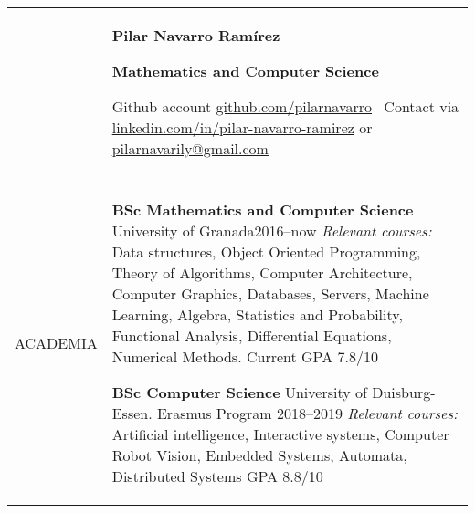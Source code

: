 \documentclass[letterpaper,10pt,oneside]{article}
\newcommand{\DatestampY}[1]{#1}
\newenvironment{body}
{\par\par
\begin{longtable}{p{0.125\textwidth}p{0.84\textwidth}}}
{\par\end{longtable}\par}
\renewcommand{\section}[3]{\\[-0.7cm]\pdfbookmark[2]{#2}{#3}\\%
\raggedleft  %
{\fontsize{9.5pt}{9.5pt}\selectfont\bfseries\raggedright%
\MakeUppercase{#1}}&}
\newcommand{\SmallEntryGap}{\par\vspace{0.38em}\par}
\newcommand{\roundpic}[4][]{
\tikz\node [circle, minimum width = #2,
path picture = {
\node [#1] at (path picture bounding box.center) {
\texttt{[image: \#4]}};
}] {};}
\begin{document}

\begin{body}

&
\vspace{-2.45cm} \par
\huge{\textbf{Pilar Navarro Ramírez}} \par
\large{\textbf{Mathematics and Computer Science}} \par
\normalsize{Github account \href{https://github.com/pilarnavarro}{github.com/pilarnavarro} \textemdash\ Contact via  \href{https://www.linkedin.com/in/pilar-navarro-ramirez/} {linkedin.com/in/pilar-navarro-ramirez} or \href{pilarnavarily@gmail.com} {pilarnavarily@gmail.com}}
\vspace{0.1cm}




\section{Academia}{Academia}{PDF:Academia}

\textbf{BSc Mathematics and Computer Science} University of Granada\hfill \DatestampY{2016}--\DatestampY{now} \newline
\textit{Relevant courses:} Data structures, Object Oriented Programming, Theory of Algorithms, Computer Architecture, Computer Graphics, Databases, Servers, Machine Learning, Algebra, Statistics and Probability, Functional Analysis, Differential Equations, Numerical Methods. \newline
Current GPA 7.8/10

\textbf{BSc Computer Science} University of Duisburg-Essen. Erasmus Program \hfill \DatestampY{2018}--\DatestampY{2019} \newline
\textit{Relevant courses:} Artificial intelligence, Interactive systems, Computer Robot Vision, Embedded Systems, Automata, Distributed Systems \newline
GPA 8.8/10



\end{body}
\end{document}
